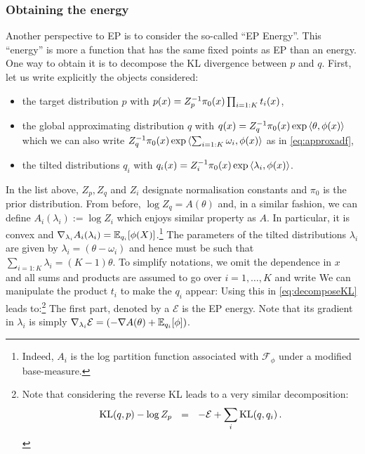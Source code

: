\subsubsection*{Obtaining the energy}
Another perspective to EP is to consider the so-called ``EP Energy''. This ``energy'' is more a function that has the same fixed points as EP than an energy. One way to obtain it is to decompose the KL divergence between $p$ and $q$. First, let us write explicitly the objects considered:
\begin{itemize}\itsepa
	\item the target distribution $p$ with $p(x)=Z_p^{-1} \pi_0(x)\prod_{i=1:K}t_i(x)$,
	\item the global approximating distribution $q$ with $q(x)=Z_q^{-1} \pi_0(x)\exp\left\langle \theta,\phi(x) \right\rangle$ which we can also write $Z_q^{-1} \pi_0(x)\exp\left\langle \sum_{i=1:K}\omega_i,\phi(x) \right\rangle$ as in \eqref{eq:approxadf},
	\item the tilted distributions $q_i$ with $q_i(x)=Z_i^{-1} \pi_0(x)\exp\left\langle \lambda_i,\phi(x) \right\rangle$.
\end{itemize}
In the list above, $Z_p,Z_q$ and $Z_i$ designate normalisation constants and $\pi_0$ is the prior distribution. From before, $\log Z_q=A(\theta)$ and, in a similar fashion, we can define $A_i(\lambda_i):=\log Z_i$ which enjoys similar property as $A$. In particular, it is convex and $\nabla_{\lambda_i} A_i(\lambda_i) = \mathbb E_{q_i}[\phi(X)]$.\footnote{Indeed, $A_i$ is the log partition function associated with $\mathcal F_\phi$ under a modified base-measure.} The parameters of the tilted distributions $\lambda_i$ are given by $\lambda_i=(\theta-\omega_i)$ and hence must be such that $\sum_{i=1:K}\lambda_i=(K-1)\theta$. To simplify notations, we omit the dependence in $x$ and all sums and products are assumed to go over $i=1,\dots,K$ and write
%
%	
We can manipulate the product $t_i$ to make the $q_i$ appear:
%
%
Using this in \eqref{eq:decomposeKL} leads to:\footnote{Note that considering the reverse KL leads to a very similar decomposition:
\[\mathrm{KL}\!\left(q,p\right) - \log Z_p \quad\!\!=\quad\!\! -\mathcal E + \sum_i \mathrm{KL}\!\left(q,q_i\right).\]}
%
%
The first part, denoted by a $\mathcal E$ is the EP energy. Note that its gradient in $\lambda_i$ is simply $\nabla_{\lambda_i}\mathcal E = (-\nabla A(\theta) + \mathbb E_{q_i}[\phi])$. 
